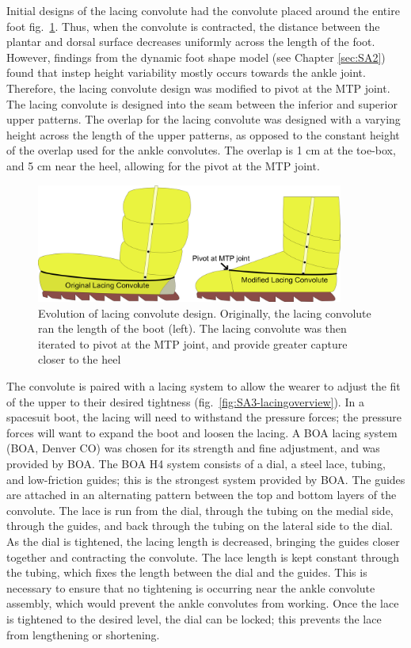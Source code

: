 \documentclass[defaultstyle,11pt]{thesis}
\begin{document}
Initial designs of the lacing convolute had the convolute placed around the entire foot fig.~\ref{fig:SA3-lacingevo}.
Thus, when the convolute is contracted, the distance between the plantar and dorsal surface decreases uniformly across the length of the foot.
However, findings from the dynamic foot shape model (see Chapter \ref{sec:SA2}) found that instep height variability mostly occurs towards the ankle joint.
Therefore, the lacing convolute design was modified to pivot at the MTP joint.
The lacing convolute is designed into the seam between the inferior and superior upper patterns.
The overlap for the lacing convolute was designed with a varying height across the length of the upper patterns, as opposed to the constant height of the overlap used for the ankle convolutes.
The overlap is 1 cm at the toe-box, and 5 cm near the heel, allowing for the pivot at the MTP joint.

\hypertarget{fig:SA3-lacingevo}{%
\begin{figure}
\centering
\includegraphics[width=0.9\textwidth,height=\textheight]{../fig/SA3/LacingConvolute_evolution.png}
\caption[{Evolution of lacing convolute design}]{Evolution of lacing convolute design. Originally, the lacing convolute ran the length of the boot (left). The lacing convolute was then iterated to pivot at the MTP joint, and provide greater capture closer to the heel}
\label{fig:SA3-lacingevo}
\end{figure}
}

The convolute is paired with a lacing system to allow the wearer to adjust the fit of the upper to their desired tightness (fig.~\ref{fig:SA3-lacingoverview}).
In a spacesuit boot, the lacing will need to withstand the pressure forces; the pressure forces will want to expand the boot and loosen the lacing.
A BOA lacing system (BOA, Denver CO) was chosen for its strength and fine adjustment, and was provided by BOA.
The BOA H4 system consists of a dial, a steel lace, tubing, and low-friction guides; this is the strongest system provided by BOA.
The guides are attached in an alternating pattern between the top and bottom layers of the convolute.
The lace is run from the dial, through the tubing on the medial side, through the guides, and back through the tubing on the lateral side to the dial.
As the dial is tightened, the lacing length is decreased, bringing the guides closer together and contracting the convolute.
The lace length is kept constant through the tubing, which fixes the length between the dial and the guides.
This is necessary to ensure that no tightening is occurring near the ankle convolute assembly, which would prevent the ankle convolutes from working.
Once the lace is tightened to the desired level, the dial can be locked; this prevents the lace from lengthening or shortening.
\end{document}
